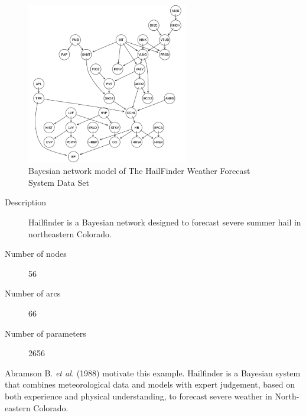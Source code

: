 	\begin{figure}[h]
	\centering
		\includegraphics[height=200pt]{images/Real_Halifinder}
		\caption{Bayesian network model of The HailFinder Weather Forecast System Data Set}
	\end{figure}	

\begin{description}
	\item[Description] Hailfinder is a Bayesian network designed to forecast severe summer hail in northeastern Colorado.

	\item[Number of nodes] 56
	
	\item[Number of arcs] 66
	
	\item[Number of parameters] 2656
\end{description}

Abramson B. \emph{et al.} (1988) motivate this example. Hailfinder is a Bayesian system that combines meteorological data and models with expert judgement, based on both experience and physical understanding, to forecast severe weather in North-eastern Colorado.

